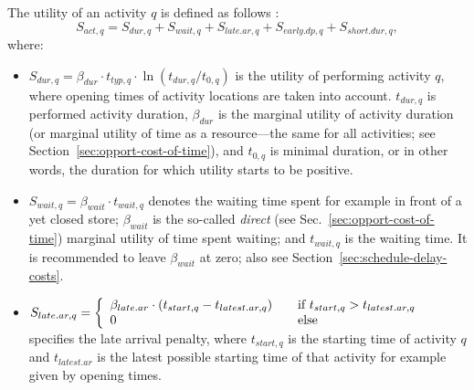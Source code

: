 The utility of an activity $q$ is defined as follows \citep[see also][p.377ff]{CharyparNagel2005ga4acts}:
\begin{equation}
S_{act,q} = S_{dur,q} + S_{wait,q} + S_{late.ar,q} + S_{early.dp, q} + S_{short.dur, q},
\label{eq:matsimUTFact}
\end{equation}
where:
\begin{itemize}\styleItemize
\item $S_{dur,q}= \beta_{dur} \cdot t_{typ,q} \cdot \ln(t_{dur,q}/t_{0,q})$ 
%
is the utility of performing activity $q$, where opening times of activity locations are taken into account. $t_{dur,q}$ is performed activity duration, $\beta_{dur}$ is the marginal utility of activity duration (or marginal utility of time as a resource---the same for all activities; see Section~\ref{sec:opport-cost-of-time}),
and $t_{0,q}$ is minimal duration, or in other words, the duration for which utility starts to be positive. 
%

\medskip

\item $ S_{wait,q} = \beta_{wait} \cdot t_{wait,q}$ 
%
  denotes the waiting time spent for example in front of a yet closed store; $\beta_{wait}$ is the so-called \emph{direct} (see Sec.~\ref{sec:opport-cost-of-time}) marginal utility of time spent waiting; and $t_{wait,q}$ is the waiting time.  It is recommended to leave $\beta_{wait}$ at zero; also see Section~\ref{sec:schedule-delay-costs}.



\medskip

\item $S_{late.ar,q}= \left\{
  \begin{array}{l l}
    \beta_{late.ar} \cdot (t_{start,q} - t_{latest.ar,q}) & \quad \text{if $t_{start,q} > t_{latest.ar,q}$}\\
    0 & \quad \text{else}
  \end{array} \right.$
%  
  specifies the late arrival penalty, where $t_{start,q}$ is the starting time of activity $q$ and $t_{latest.ar}$ is the latest possible starting time of that activity for example given by opening times.


\end{itemize}

